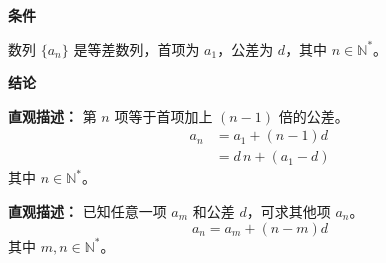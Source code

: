 \begin{statementbox}
	\textbf{\textcolor{CStatement}{条件}}
	\begin{description}[style=nextline, leftmargin=2.8em, labelsep=0.5em, itemsep=0.35em]
		\item[\textbf{\textcolor{CStatement}{条件 1（等差定义）：}}] 数列 $\{a_n\}$ 是等差数列，首项为 $a_1$，公差为 $d$，其中 $n\in\mathbb{N}^*$。
	\end{description}

	\textbf{\textcolor{CStatement}{结论}}
	\begin{description}[style=nextline, leftmargin=2.8em, labelsep=0.5em, itemsep=0.45em]
		\item[\textbf{\textcolor{CStatement}{结论一（通项公式）：}}]
			\textbf{\textcolor{CStatement}{直观描述：}}
			第 $n$ 项等于首项加上 $(n-1)$ 倍的公差。
			\[
				\begin{aligned}
					a_n &= a_1 + (n-1)d \\
					&= d\,n + (a_1 - d)
			\end{aligned}
			\]
			其中 $n\in\mathbb{N}^*$。
		\item[\textbf{\textcolor{CStatement}{推广结论（通项变形）：}}]
			\textbf{\textcolor{CStatement}{直观描述：}}
			已知任意一项 $a_m$ 和公差 $d$，可求其他项 $a_n$。
			\[
				a_n = a_m + (n-m)d
			\]
			其中 $m,n\in\mathbb{N}^*$。
	\end{description}
\end{statementbox}
